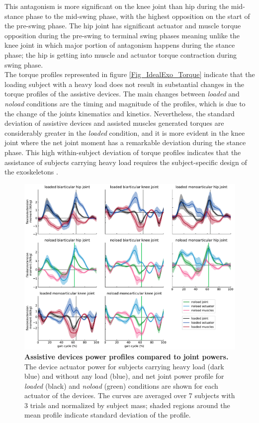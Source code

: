 \documentclass[10pt,letterpaper]{article}
\begin{document}
This antagonism is more significant on the knee joint than hip during the mid-stance phase to the mid-swing phase, with the highest opposition on the start of the pre-swing phase. The hip joint has significant actuator and muscle torque opposition during the pre-swing to terminal swing phases meaning unlike the knee joint in which major portion of antagonism happens during the stance phase; the hip is getting into muscle and actuator torque contraction during swing phase. \\
The torque profiles represented in figure \ref{Fig_IdealExo_Torque} indicate that the loading subject with a heavy load does not result in substantial changes in the torque profiles of the assistive devices. The main changes between \textit{loaded} and \textit{noload} conditions are the timing and magnitude of the profiles, which is due to the change of the joints kinematics and kinetics.
Nevertheless, the standard deviation of assistive devices and assisted muscles generated torques are considerably greater in the \textit{loaded} condition, and it is more evident in the knee joint where the net joint moment has a remarkable deviation during the stance phase. This high within-subject deviation of torque profiles indicates that the assistance of subjects carrying heavy load requires the subject-specific design of the exoskeletons \cite{2}.\\
\begin{figure}[ht]   
	\centering
	\includegraphics[width=\linewidth]{Ideal_Exo_MonovsBi_Figures/PaperFigure_Exoskeletons_Power.pdf}
	\vspace{1mm}
	\caption{{\small\textbf{Assistive devices power profiles compared to joint powers.} The device actuator power for subjects carrying heavy load (dark blue) and without any load (blue), and net joint power profile for \textit{loaded} (black) and \textit{noload} (green) conditions are shown for each actuator of the devices. The curves are averaged over 7 subjects with 3 trials and normalized by subject mass; shaded regions around the mean profile indicate standard deviation of the profile.}}
	\label{Fig_IdealExo_Power}
\end{figure}
\end{document}
